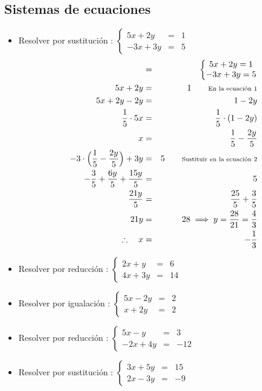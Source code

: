 \documentclass[11pt, twocolumn, landscape, a4paper]{article}
\begin{document}
\subsection*{Sistemas de ecuaciones}
\begin{itemize}
\item{Resolver por sustitución : $\left\{\begin{matrix} 5x + 2y &=& 1 \\ -3x + 3y &=& 5\end{matrix}\right.$
\begin{eqnarray*}
\empty &=& \left\{\begin{matrix} 5x + 2y = 1 \\ -3x + 3y = 5\end{matrix}\right. \\
5x + 2y &=& 1 \qquad \text{{\scriptsize En la ecuación 1}}\\
5x + 2y - 2y &=& 1 - 2y\\
\dfrac1{5} \cdot 5x &=& \dfrac1{5} \cdot (1 - 2y) \\
x &=& \dfrac1{5}  - \dfrac{2y}{5} \\
-3 \cdot \Big( \dfrac1{5}  - \dfrac{2y}{5}\Big) + 3y &=& 5 \qquad \text{{\scriptsize Sustituir en la ecuación 2}} \\
-\dfrac{3}{5} + \dfrac{6y}{5} + \dfrac{15y}{5} &=& 5 \\
\dfrac{21y}{5} &=& \dfrac{25}{5} + \dfrac{3}{5} \\
21y &=& 28 \implies y = \dfrac{28}{21} = \dfrac{4}{3} \\
\therefore\quad x &=& -\dfrac1{3}
\end{eqnarray*}
}
\item{Resolver por reducción : $\left\{\begin{matrix} 2x + y &=& 6 \\ 4x + 3y &=& 14\end{matrix}\right.$}
\item{Resolver por igualación : $\left\{\begin{matrix} 5x - 2y &=& 2 \\ x + 2y &=& 2\end{matrix}\right.$}
\item{Resolver por reducción : $\left\{\begin{matrix} 5x - y &=& 3 \\ -2x + 4y &=& -12\end{matrix}\right.$}
\item{Resolver por sustitución : $\left\{\begin{matrix} 3x + 5y &=& 15 \\ 2x - 3y &=& -9\end{matrix}\right.$}

\end{itemize}
\end{document}
